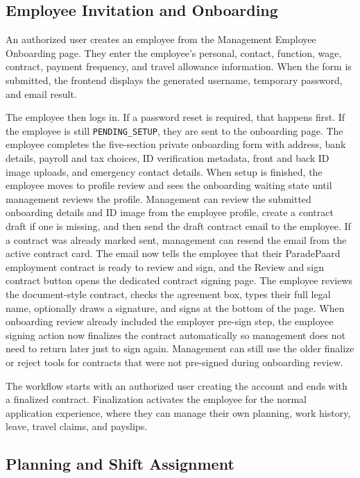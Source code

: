\documentclass[11pt]{article}
\newcommand{\code}[1]{\nolinkurl{#1}}
\begin{document}
\subsection{Employee Invitation and Onboarding}

An authorized user creates an employee from the Management Employee Onboarding page. They enter the employee's personal, contact, function, wage, contract, payment frequency, and travel allowance information. When the form is submitted, the frontend displays the generated username, temporary password, and email result.

The employee then logs in. If a password reset is required, that happens first. If the employee is still \code{PENDING_SETUP}, they are sent to the onboarding page. The employee completes the five-section private onboarding form with address, bank details, payroll and tax choices, ID verification metadata, front and back ID image uploads, and emergency contact details. When setup is finished, the employee moves to profile review and sees the onboarding waiting state until management reviews the profile. Management can review the submitted onboarding details and ID image from the employee profile, create a contract draft if one is missing, and then send the draft contract email to the employee. If a contract was already marked sent, management can resend the email from the active contract card. The email now tells the employee that their ParadePaard employment contract is ready to review and sign, and the Review and sign contract button opens the dedicated contract signing page. The employee reviews the document-style contract, checks the agreement box, types their full legal name, optionally draws a signature, and signs at the bottom of the page. When onboarding review already included the employer pre-sign step, the employee signing action now finalizes the contract automatically so management does not need to return later just to sign again. Management can still use the older finalize or reject tools for contracts that were not pre-signed during onboarding review.

The workflow starts with an authorized user creating the account and ends with a finalized contract. Finalization activates the employee for the normal application experience, where they can manage their own planning, work history, leave, travel claims, and payslips.

\subsection{Planning and Shift Assignment}
\end{document}
